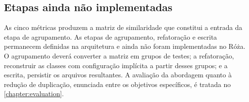\subsection{Etapas ainda não implementadas}

As cinco métricas produzem a matriz de similaridade que constitui a entrada da etapa de agrupamento. As etapas de agrupamento, refatoração e escrita permanecem definidas na arquitetura e ainda não foram implementadas no Róża. O agrupamento deverá converter a matriz em grupos de testes; a refatoração, reconstruir as classes com configuração implícita a partir desses grupos; e a escrita, persistir os arquivos resultantes. A avaliação da abordagem quanto à redução de duplicação, enunciada entre os objetivos específicos, é tratada no \autoref{chapter:evaluation}.
